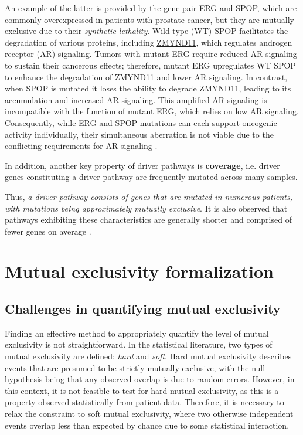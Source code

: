 An example of the latter is provided by the gene pair \href{https://en.wikipedia.org/wiki/ERG_(gene)}{ERG} and \href{https://en.wikipedia.org/wiki/SPOP}{SPOP}, which are commonly overexpressed in patients with prostate cancer, but they are mutually exclusive due to their \textit{synthetic lethality}. Wild-type (WT) SPOP facilitates the degradation of various proteins, including \href{https://en.wikipedia.org/wiki/ZMYND11Jjla}{ZMYND11}, which regulates androgen receptor (AR) signaling. Tumors with mutant ERG require reduced AR signaling to sustain their cancerous effects; therefore, mutant ERG upregulates WT SPOP to enhance the degradation of ZMYND11 and lower AR signaling. In contrast, when SPOP is mutated it loses the ability to degrade ZMYND11, leading to its accumulation and increased AR signaling. This amplified AR signaling is incompatible with the function of mutant ERG, which relies on low AR signaling. Consequently, while ERG and SPOP mutations can each support oncogenic activity individually, their simultaneous aberration is not viable due to the conflicting requirements for AR signaling \cite{erg_spop}.

In addition, another key property of driver pathways is \textbf{coverage}, i.e. driver genes constituting a driver pathway are frequently mutated across many samples. 

Thus, \textit{a driver pathway consists of genes that are mutated in numerous patients, with mutations being approximately mutually exclusive}. It is also observed that pathways exhibiting these characteristics are generally shorter and comprised of fewer genes on average \cite{multi-dendrix}.

\section{Mutual exclusivity formalization}

\subsection{Challenges in quantifying mutual exclusivity}

Finding an effective method to appropriately quantify the level of mutual exclusivity is not straightforward. In the statistical literature, two types of mutual exclusivity are defined: \textit{hard} and \textit{soft}. Hard mutual exclusivity describes events that are presumed to be strictly mutually exclusive, with the null hypothesis being that any observed overlap is due to random errors. However, in this context, it is not feasible to test for hard mutual exclusivity, as this is a property observed statistically from patient data. Therefore, it is necessary to relax the constraint to soft mutual exclusivity, where two otherwise independent events overlap less than expected by chance due to some statistical interaction.

